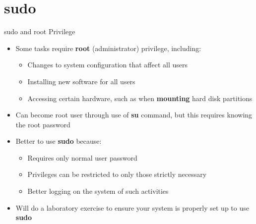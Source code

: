 \section{sudo}
\begin{frame}
   {sudo and root Privilege}

   \begin{itemize}
      \item
      Some tasks require \textbf{root} (administrator)
      privilege, including:
      \begin{itemize}
         \item
         Changes to system configuration that affect all users
         \item
         Installing new software for all users
         \item
         Accessing certain hardware, such as when
         \textbf{mounting} hard disk partitions
      \end{itemize}
      \item
      Can become root user through use of \textbf{su} command,
      but this requires knowing the root password
      \item
      Better to use \textbf{sudo} because:
      \begin{itemize}
         \item
         Requires only normal user password
         \item
         Privileges can be restricted to only those strictly
         necessary
         \item
         Better logging on the system of such activities
      \end{itemize}
      \item
      Will do a laboratory exercise to ensure your system is
      properly set up to use \textbf{sudo}
   \end{itemize}


\end{frame}

\cprotect{}

